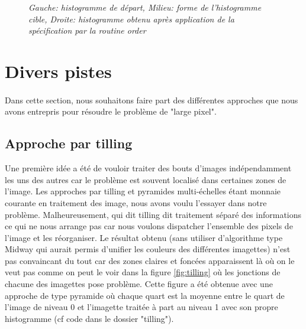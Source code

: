 \documentclass{article}
\begin{document}
\begin{figure}[!hbt]
\begin{minipage}{0.33\textwidth}
\end{minipage}
\caption{\textit{Gauche: histogramme de départ, Milieu: forme de l'histogramme cible, Droite: histogramme obtenu après application de la spécification par la routine order}}
\label{fig:im_xx}
\end{figure}
\FloatBarrier

\section{Divers pistes}
\paragraph*{}
Dans cette section, nous souhaitons faire part des différentes approches que nous avons entrepris pour résoudre le problème de "large pixel". 

\subsection{Approche par tilling}
Une première idée a été de vouloir traiter des bouts d'images indépendamment les uns des autres car le problème est souvent localisé dans certaines zones de l'image. Les approches par tilling et pyramides multi-échelles étant monnaie courante en traitement des image, nous avons voulu l'essayer dans notre problème. Malheureusement, qui dit tilling dit traitement séparé des informations ce qui ne nous arrange pas car nous voulons dispatcher l'ensemble des pixels de l'image et les réorganiser. Le résultat obtenu (sans utiliser d'algorithme type Midway qui aurait permis d'unifier les couleurs des différentes imagettes) n'est pas convaincant du tout car des zones claires et foncées apparaissent là où on le veut pas comme on peut le voir dans la figure \ref{fig:tilling} où les jonctions de chacune des imagettes pose problème. Cette figure a été obtenue avec une approche de type pyramide où chaque quart est la moyenne entre le quart de l'image de niveau 0 et l'imagette traitée à part au niveau 1 avec son propre histogramme (cf code dans le dossier "tilling").
\end{document}
